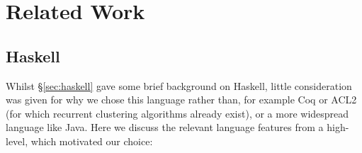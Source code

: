 \section{Related Work}
\label{sec:related}

\subsection{Haskell}
\label{sec:haskelldesc}

Whilst \S \ref{sec:haskell} gave some brief background on Haskell, little consideration was given for why we chose this language rather than, for example Coq or ACL2 (for which recurrent clustering algorithms already exist), or a more widespread language like Java. Here we discuss the relevant language features from a high-level, which motivated our choice:

